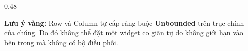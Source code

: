 \documentclass[aspectratio=169, 10pt]{beamer}
\begin{document}
\begin{frame}
\begin{columns}[T]
\begin{column}{0.48\textwidth}
      \vspace{0.15cm}
      \begin{tcolorbox}[colback=CardBg, colframe=NavyHeader!30, arc=4pt, boxrule=0.8pt, left=6pt, right=6pt, top=4pt, bottom=4pt]
        {\scriptsize \textbf{Lưu ý vàng:} Row và Column tự cấp ràng buộc \textbf{Unbounded} trên trục chính của chúng. Do đó không thể đặt một widget co giãn tự do không giới hạn vào bên trong mà không có bộ điều phối.}
      \end{tcolorbox}
    \end{column}
  \end{columns}
\end{frame}

\end{document}
